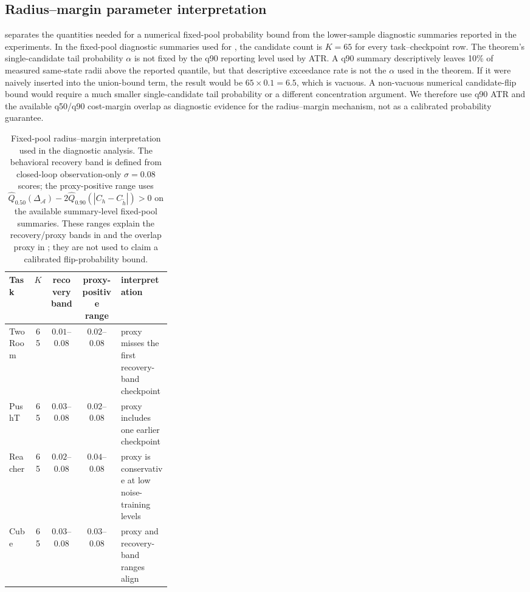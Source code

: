 \documentclass[10pt]{article}
\begin{document}
\subsection{Radius--margin parameter interpretation}\label{sec:appendix-radius-margin-params}

 separates the quantities needed for a numerical fixed-pool probability bound from the lower-sample diagnostic summaries reported in the experiments. In the fixed-pool diagnostic summaries used for , the candidate count is $K=65$ for every task--checkpoint row. The theorem's single-candidate tail probability $\alpha$ is not fixed by the q90 reporting level used by ATR. A q90 summary descriptively leaves 10\% of measured same-state radii above the reported quantile, but that descriptive exceedance rate is not the $\alpha$ used in the theorem. If it were naively inserted into the union-bound term, the result would be $65\times0.1=6.5$, which is vacuous. A non-vacuous numerical candidate-flip bound would require a much smaller single-candidate tail probability or a different concentration argument. We therefore use q90 ATR and the available q50/q90 cost-margin overlap as diagnostic evidence for the radius--margin mechanism, not as a calibrated probability guarantee.

\begin{table}[H]
\centering
\caption{Fixed-pool radius--margin interpretation used in the diagnostic analysis. The behavioral recovery band is defined from closed-loop observation-only $\sigma=0.08$ scores; the proxy-positive range uses $\widehat Q_{0.50}(\Delta_{\mathcal A})-2\widehat Q_{0.90}(|C_h-C_{\tilde h}|)>0$ on the available summary-level fixed-pool summaries. These ranges explain the recovery/proxy bands in  and the overlap proxy in ; they are not used to claim a calibrated flip-probability bound.}
\label{tab:appendix-radius-margin-params}
\small
\setlength{\tabcolsep}{4pt}
\begin{tabular}{lccc p{0.31\linewidth}}
\toprule
Task & $K$ & recovery band & proxy-positive range & interpretation \\
\midrule
TwoRoom & 65 & $0.01$--$0.08$ & $0.02$--$0.08$ & proxy misses the first recovery-band checkpoint \\
PushT & 65 & $0.03$--$0.08$ & $0.02$--$0.08$ & proxy includes one earlier checkpoint \\
Reacher & 65 & $0.02$--$0.08$ & $0.04$--$0.08$ & proxy is conservative at low noise-training levels \\
Cube & 65 & $0.03$--$0.08$ & $0.03$--$0.08$ & proxy and recovery-band ranges align \\
\bottomrule
\end{tabular}
\end{table}
\end{document}
